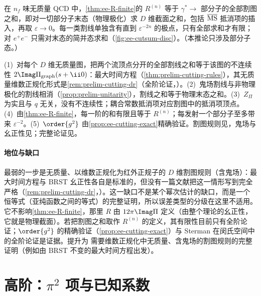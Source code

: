 \begin{corollary}\label{cor:ee-cuts}
在 $n_f$ 味无质量 QCD 中，\cref{thm:ee-R-finite}的 $R^{(n)}$ 等于 $\gamma^*\to$ 部分子的全部割图之和，即对一切部分子末态（物理极化）求 $D$ 维截面之和，包括 $\overline{\rm MS}$ 抵消项的插入，再取 $\varepsilon\to0$。每一类割线单独含有直到 $\varepsilon^{-2n}$ 的极点，只有全部求和才有限；对 $e^+e^-$ 只需对末态的简并态求和（\cref{fig:ee-cutsum-disc}）。（本推论只涉及部分子态。）
\end{corollary}
\begin{proofsketch}
(1)~对每个 $D$ 维无质量图，把两个流顶点分开的全部割线之和等于该图的不连续性 $2\Imag\Pi_{\rm graph}(s+\ii0)$：最大时间方程（\cref{thm:prelim-cutting-rules}），其无质量维数正规化形式是\cref{rem:prelim-cutting-dr}（全阶论证，\tagA）。(2)~鬼场割线与非物理极化的割线相消（\cref{prop:prelim-unitarity}），割线之和等于物理末态之和。(3)~$Z_\Pi$ 为实且与 $q$ 无关，没有不连续性；耦合常数抵消项对应割图中的抵消项顶点。(4)~由\cref{thm:ee-R-finite}，每一阶的和有限且等于 $R^{(n)}$；每发射一个部分子至多带来 $\varepsilon^{-2}$。(5)~$\order{g^2}$ 由\cref{prop:ee-cutting-exact}精确验证。割图规则见\cite{Cutkosky1960,Veltman1963,tHooftVeltman1974}，鬼场与幺正性见\cite{tHooftVeltman1972b,KugoOjima1979}；完整论证见\cite{Sterman1978a,Sterman1978b}。
\end{proofsketch}

\paragraph{地位与缺口}最弱的一步是无质量、以维数正规化为红外正规子的 $D$ 维割图规则（含鬼场）：最大时间方程与 BRST 幺正性各自是标准的，但没有一篇文献把这一情形写到完全严格（\cref{rem:prelim-cutting-dr}，\tagA）。这一缺口不是某个幂次估计的缺口，而是一个恒等式（亚纯函数之间的等式）的完整证明，所以误差类型的分级在这里不适用。它不影响\cref{thm:ee-R-finite}，那里 $R$ 由 $12\pi\Imag\Pi$ 定义（由整个理论的幺正性，它就是物理截面）。若把割图之和取作 $R^{(n)}$ 的定义，其有限性目前只有全阶论证；$\order{g^2}$ 的精确验证（\cref{prop:ee-cutting-exact}）与 Sterman 在闵氏空间中的全阶论证\cite{Sterman1978a,Sterman1978b}是证据。提升为 \tagR 需要维数正规化中无质量、含鬼场的割图规则的完整证明（例如由 BRST 不变的最大时间方程出发）。

\section{高阶：$\pi^2$ 项与已知系数}\label{sec:ee-higher}

